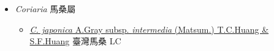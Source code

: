 
  \begin{itemize}
 \item[] \textit{Coriaria} 馬桑屬
                                
  \begin{itemize}
        \item[] \href{http://www.theplantlist.org/tpl1.1/search?q=Coriaria+japonica+subsp.+intermedia}{\textit{C. japonica} A.Gray subsp. \textit{intermedia} (Matsum.) T.C.Huang \& S.F.Huang}   臺灣馬桑   LC
  \end{itemize}
  \end{itemize}
